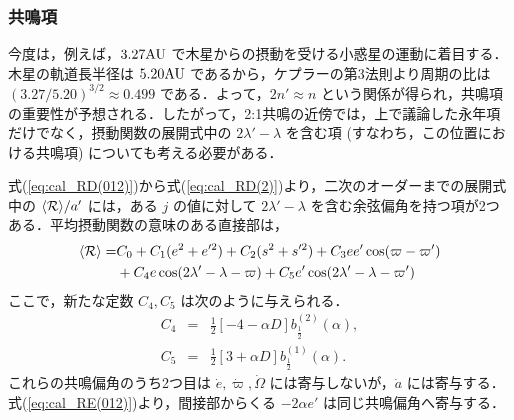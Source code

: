 \documentclass[11pt,a4paper,oneside,onecolumn]{jreport}
\begin{document}
\subsubsection{共鳴項}
今度は，例えば，$3.27{\rm AU}$ で木星からの摂動を受ける小惑星の運動に着目する．木星の軌道長半径は $5.20 {\rm AU}$ であるから，ケプラーの第3法則より周期の比は $(3.27/5.20)^{3/2} \approx 0.499$ である．よって，$2 n' \approx n$ という関係が得られ，共鳴項の重要性が予想される．したがって，2:1共鳴の近傍では，上で議論した永年項だけでなく，摂動関数の展開式中の $2 \lambda' - \lambda$ を含む項 (すなわち，この位置における共鳴項) についても考える必要がある．

式(\ref{eq:cal_RD(012)})から式(\ref{eq:cal_RD(2)})より，二次のオーダーまでの展開式中の $\langle {\cal R} \rangle / a'$ には，ある $j$ の値に対して $2\lambda' - \lambda$ を含む余弦偏角を持つ項が2つある．平均摂動関数の意味のある直接部は，
\begin{equation}
\begin{split}
\langle {\cal R} \rangle = & C_0 + C_1 (e^2 + e'^2) + C_2 (s^2 + s'^2) + C_3 e e' \cos (\varpi - \varpi') \\
& + C_4 e \cos (2 \lambda' - \lambda - \varpi) + C_5 e' \cos (2 \lambda' - \lambda - \varpi')
\end{split}
\end{equation} 
ここで，新たな定数 $C_4, C_5$ は次のように与えられる．
\begin{eqnarray}
C_4 & = & \frac{1}{2} [- 4 - \alpha D] b_{\frac{1}{2}}^{(2)} (\alpha), \\
C_5 & = & \frac{1}{2} [3 + \alpha D] b_{\frac{1}{2}}^{(1)} (\alpha).
\end{eqnarray}
これらの共鳴偏角のうち2つ目は $\dot{e}, \dot{\varpi}, \dot{\Omega}$ には寄与しないが，$\dot{a}$ には寄与する．式(\ref{eq:cal_RE(012)})より，間接部からくる $- 2 \alpha e'$ は同じ共鳴偏角へ寄与する．
\end{document}
